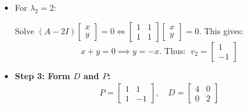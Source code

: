     \begin{frame}{}
    \begin{itemize}
    \item 
    For \( \lambda_2 = 2 \):

    Solve \( (A - 2I )\begin{bmatrix} x \\ y \end{bmatrix}  = 0 \Longleftrightarrow\begin{bmatrix} 1 & 1 \\ 1 & 1 \end{bmatrix} \begin{bmatrix} x \\ y \end{bmatrix} = 0 \). This gives:
    \[
    x + y = 0 \implies y = -x. \text{ Thus: } \; v_2=\begin{bmatrix} 1 \\ -1 \end{bmatrix}
    \]
    \item  \textbf{Step 3: Form $D$ and $P$:}
        \begin{align*}
           P = \begin{bmatrix}
        1 & 1 \\
        1 & -1
        \end{bmatrix}, \quad D = \begin{bmatrix}
        4 & 0 \\
        0 & 2
        \end{bmatrix} 
        \end{align*}
    \end{itemize}
    \end{frame}


